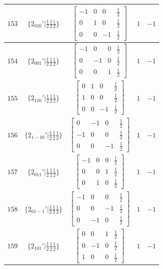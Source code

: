 \documentclass[fleqn,8pt]{jsarticle}
\begin{document}
\begin{longtable}{ccccc}
$ 153 $ & $ \{2{}_{010}{}'|\frac{1}{2} \frac{1}{2} \frac{1}{2}\} $ & $ \begin{bmatrix} -1 & 0 & 0 & \frac{1}{2} \\ 0 & 1 & 0 & \frac{1}{2} \\ 0 & 0 & -1 & \frac{1}{2} \end{bmatrix} $ & $ 1 $ & $ -1 $ \\ \hline
$ 154 $ & $ \{2{}_{001}{}'|\frac{1}{2} \frac{1}{2} \frac{1}{2}\} $ & $ \begin{bmatrix} -1 & 0 & 0 & \frac{1}{2} \\ 0 & -1 & 0 & \frac{1}{2} \\ 0 & 0 & 1 & \frac{1}{2} \end{bmatrix} $ & $ 1 $ & $ -1 $ \\ \hline
$ 155 $ & $ \{2{}_{110}{}'|\frac{1}{2} \frac{1}{2} \frac{1}{2}\} $ & $ \begin{bmatrix} 0 & 1 & 0 & \frac{1}{2} \\ 1 & 0 & 0 & \frac{1}{2} \\ 0 & 0 & -1 & \frac{1}{2} \end{bmatrix} $ & $ 1 $ & $ -1 $ \\ \hline
$ 156 $ & $ \{2{}_{1-10}{}'|\frac{1}{2} \frac{1}{2} \frac{1}{2}\} $ & $ \begin{bmatrix} 0 & -1 & 0 & \frac{1}{2} \\ -1 & 0 & 0 & \frac{1}{2} \\ 0 & 0 & -1 & \frac{1}{2} \end{bmatrix} $ & $ 1 $ & $ -1 $ \\ \hline
$ 157 $ & $ \{2{}_{011}{}'|\frac{1}{2} \frac{1}{2} \frac{1}{2}\} $ & $ \begin{bmatrix} -1 & 0 & 0 & \frac{1}{2} \\ 0 & 0 & 1 & \frac{1}{2} \\ 0 & 1 & 0 & \frac{1}{2} \end{bmatrix} $ & $ 1 $ & $ -1 $ \\ \hline
$ 158 $ & $ \{2{}_{01-1}{}'|\frac{1}{2} \frac{1}{2} \frac{1}{2}\} $ & $ \begin{bmatrix} -1 & 0 & 0 & \frac{1}{2} \\ 0 & 0 & -1 & \frac{1}{2} \\ 0 & -1 & 0 & \frac{1}{2} \end{bmatrix} $ & $ 1 $ & $ -1 $ \\ \hline
$ 159 $ & $ \{2{}_{101}{}'|\frac{1}{2} \frac{1}{2} \frac{1}{2}\} $ & $ \begin{bmatrix} 0 & 0 & 1 & \frac{1}{2} \\ 0 & -1 & 0 & \frac{1}{2} \\ 1 & 0 & 0 & \frac{1}{2} \end{bmatrix} $ & $ 1 $ & $ -1 $ \\ \hline

\end{longtable}
\end{document}

